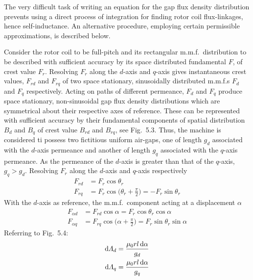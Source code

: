 \documentclass[a4paper,numbers=noenddot,12pt]{scrbook}
\begin{document}
        The very difficult task of writing an equation for the gap flux density distribution prevents using a direct process of integration for finding rotor coil flux-linkages, hence self-inductance. An alternative procedure, employing certain permissible approximations, is described below. \par

        Consider the rotor coil to be full-pitch and its rectangular m.m.f.\ distribution to be described with sufficient accuracy by its space distributed fundamental $F$, of crest value $F_r$. Resolving $F_r$ along the $d$-axis and $q$-axis gives instantaneous crest values, $F_{rd}$ and $F_{rq}$ of two space stationary, sinusoidally distributed m.m.f.s $F_d$ and $F_q$ respectively. Acting on paths of different permeance, $F_d$ and $F_q$ produce space stationary, non-sinusoidal gap flux density distributions which are symmetrical about their respective axes of reference. These can be represented with sufficient accuracy by their fundamental components of spatial distribution $B_d$ and $B_q$ of crest value $B_{rd}$ and $B_{rq}$, see Fig.\ 5.3. Thus, the machine is considered ti possess two fictitious uniform air-gaps, one of length $g_d$ associated with the $d$-axis permeance and another of length $g_q$ associated with the $q$-axis permeance. As the permeance of the $d$-axis is greater than that of the $q$-axis, $g_q>g_d$. Resolving $F_r$ along the $d$-axis and $q$-axis respectively
        \begin{equation}
            \begin{aligned}
                F_{rd} & = F_r \cos \theta_r \\
                F_{rq} & = F_r \cos\bigg( \theta_r+\frac{\pi}{2} \bigg)= -F_r \sin \theta_r
            \end{aligned}
        \end{equation}
        With the $d$-axis as reference, the m.m.f.\ component acting at a displacement $\alpha$
        \begin{equation}
            \begin{aligned}
                F_{\alpha d} & = F_{r d} \cos \alpha = F_r  \cos \theta_r \cos \alpha \\
                F_{\alpha q} & = F_{r q} \cos\bigg( \alpha + \frac{\pi}{2} \bigg)= F_r \sin \theta_r \sin \alpha 
            \end{aligned}
        \end{equation}
        Referring to Fig.\ 5.4:
        \begin{equation}
            \begin{aligned}
                \dif \varLambda_d & = \frac{\mu_0 r l \dif \alpha}{g_d}  \\
                \dif \varLambda_q & = \frac{\mu_0 r l \dif \alpha}{g_q} 
            \end{aligned}
        \end{equation}
\end{document}
